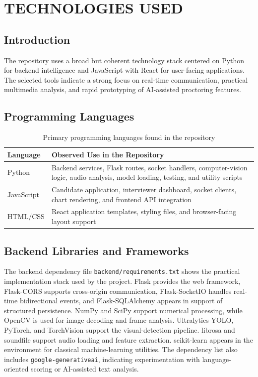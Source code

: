 \documentclass[12pt,a4paper]{extreport}
\begin{document}
\chapter{TECHNOLOGIES USED}
\section{Introduction}
The repository uses a broad but coherent technology stack centered on Python for backend intelligence and JavaScript with React for user-facing applications. The selected tools indicate a strong focus on real-time communication, practical multimedia analysis, and rapid prototyping of AI-assisted proctoring features.

\section{Programming Languages}
\begin{table}[H]
\centering
\caption{Primary programming languages found in the repository}
\begin{tabularx}{\textwidth}{p{3cm}X}
\toprule
\textbf{Language} & \textbf{Observed Use in the Repository}\\
\midrule
Python & Backend services, Flask routes, socket handlers, computer-vision logic, audio analysis, model loading, testing, and utility scripts\\
JavaScript & Candidate application, interviewer dashboard, socket clients, chart rendering, and frontend API integration\\
HTML/CSS & React application templates, styling files, and browser-facing layout support\\
\bottomrule
\end{tabularx}
\end{table}

\section{Backend Libraries and Frameworks}
The backend dependency file \texttt{backend/requirements.txt} shows the practical implementation stack used by the project. Flask provides the web framework, Flask-CORS supports cross-origin communication, Flask-SocketIO handles real-time bidirectional events, and Flask-SQLAlchemy appears in support of structured persistence. NumPy and SciPy support numerical processing, while OpenCV is used for image decoding and frame analysis. Ultralytics YOLO, PyTorch, and TorchVision support the visual-detection pipeline. librosa and soundfile support audio loading and feature extraction. scikit-learn appears in the environment for classical machine-learning utilities. The dependency list also includes \texttt{google-generativeai}, indicating experimentation with language-oriented scoring or AI-assisted text analysis.
\end{document}
